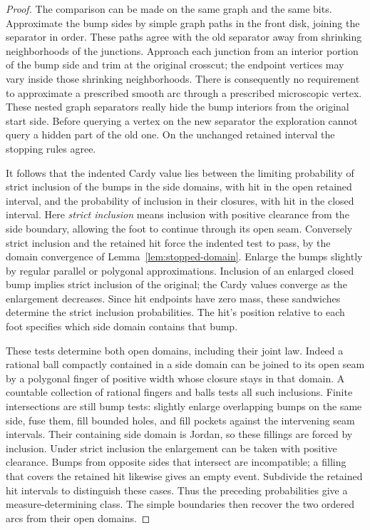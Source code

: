 \begin{proof}
The comparison can be made on the same graph and the same bits.
Approximate the bump sides by simple graph paths in the front disk,
joining the separator in order.  These paths agree with the old
separator away from shrinking neighborhoods of the junctions.
Approach each junction from an interior portion of the bump side
and trim at the original crosscut; the endpoint vertices may vary
inside those shrinking neighborhoods.  There is consequently no
requirement to approximate a prescribed smooth arc through a
prescribed microscopic vertex.  These nested graph separators
really hide the bump interiors from the original start side.
Before querying a vertex on the new separator the exploration
cannot query a hidden part of the old one.  On the unchanged
retained interval the stopping rules agree.

It follows that the indented Cardy value lies between the limiting
probability of strict inclusion of the bumps in the side domains,
with hit in the open retained interval, and the probability of
inclusion in their closures, with hit in the closed interval.
Here \emph{strict inclusion} means inclusion with positive clearance
from the side boundary, allowing the foot to continue through its
open seam.  Conversely strict inclusion and the retained hit force
the indented test to pass, by the domain convergence of
Lemma~\ref{lem:stopped-domain}.  Enlarge the bumps slightly by
regular parallel or polygonal approximations.  Inclusion of an
enlarged closed bump implies strict inclusion of the original;
the Cardy values converge as the enlargement decreases.  Since
hit endpoints have zero mass, these sandwiches determine the
strict inclusion probabilities.  The hit's position relative to
each foot specifies which side domain contains that bump.

These tests determine both open domains, including their joint law.
Indeed a rational ball compactly contained in a side domain can
be joined to its open seam by a polygonal finger of positive width
whose closure stays in that domain.  A countable collection of
rational fingers and balls tests all such inclusions.  Finite
intersections are still bump tests: slightly enlarge overlapping
bumps on the same side, fuse them, fill bounded holes, and fill
pockets against the intervening seam intervals.  Their containing
side domain is Jordan, so these fillings are forced by inclusion.
Under strict inclusion the enlargement can be taken with positive
clearance.  Bumps from opposite sides that intersect are
incompatible; a filling that covers the retained hit likewise
gives an empty event.  Subdivide the retained hit intervals to
distinguish these cases.  Thus the preceding probabilities give a
measure-determining class.  The simple boundaries then recover
the two ordered arcs from their open domains.


\end{proof}
